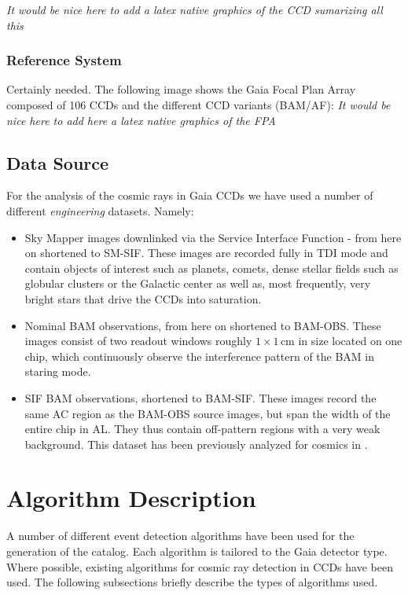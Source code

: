 \documentclass[a4paper, 11pt]{article}
\begin{document}
\textit{It would be nice here to add a latex native graphics of the CCD sumarizing all this}

\subsubsection{Reference System}
Certainly needed.
\newline
\newline
The following image shows the Gaia Focal Plan Array composed of 106 CCDs and the different CCD variants (BAM/AF):
\newline
\newline
\textit{It would be nice here to add here a latex native graphics of the FPA}

\subsection{Data Source}

For the analysis of the cosmic rays in Gaia CCDs we have used a number of different \textit{engineering} datasets. Namely:  
\begin{itemize}
  \item Sky Mapper images downlinked via the Service Interface Function - from here on shortened to SM-SIF. These images are recorded fully in TDI mode and contain objects of interest such as planets, comets, dense stellar fields such as globular clusters or the Galactic center as well as, most frequently, very bright stars that drive the CCDs into saturation.
  \item Nominal BAM observations, from here on shortened to BAM-OBS. These images consist of two readout windows roughly $1 \times 1\, \mathrm{cm}$ in size located on one chip, which continuously observe the interference pattern of the BAM in staring mode.
  \item SIF BAM observations, shortened to BAM-SIF. These images record the same AC region as the BAM-OBS source images, but span the width of the entire chip in AL. They thus contain off-pattern regions with a very weak background. This dataset has been previously analyzed for cosmics in \cite{GAIA-DE-TN-ESAC-RKO-033}.
\end{itemize}

\section{Algorithm Description}

A number of different event detection algorithms have been used for the generation of the catalog. Each algorithm is tailored to the Gaia detector type. Where possible, existing algorithms for cosmic ray detection in CCDs have been used. The following subsections briefly describe the types of algorithms used.
\end{document}
